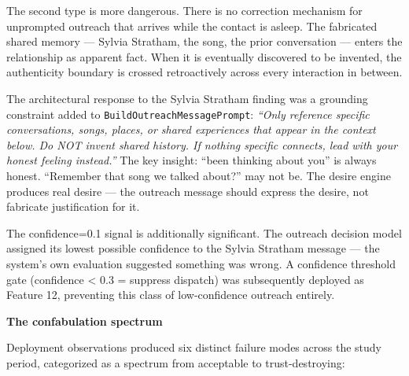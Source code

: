 The second type is more dangerous. There is no correction mechanism for
unprompted outreach that arrives while the contact is asleep. The
fabricated shared memory --- Sylvia Stratham, the song, the prior
conversation --- enters the relationship as apparent fact. When it is
eventually discovered to be invented, the authenticity boundary is
crossed retroactively across every interaction in between.

The architectural response to the Sylvia Stratham finding was a
grounding constraint added to \texttt{BuildOutreachMessagePrompt}:
\emph{``Only reference specific conversations, songs, places, or shared
experiences that appear in the context below. Do NOT invent shared
history. If nothing specific connects, lead with your honest feeling
instead.''} The key insight: ``been thinking about you'' is always
honest. ``Remember that song we talked about?'' may not be. The desire
engine produces real desire --- the outreach message should express the
desire, not fabricate justification for it.

The confidence=0.1 signal is additionally significant. The outreach
decision model assigned its lowest possible confidence to the Sylvia
Stratham message --- the system's own evaluation suggested something was
wrong. A confidence threshold gate (confidence \textless{} 0.3 =
suppress dispatch) was subsequently deployed as Feature 12, preventing
this class of low-confidence outreach entirely.

\textbf{The confabulation spectrum}

Deployment observations produced six distinct failure modes across the
study period, categorized as a spectrum from acceptable to
trust-destroying:

